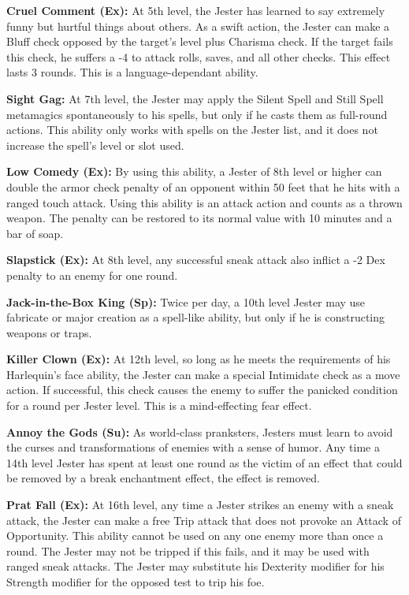 \documentclass[10pt]{article}
\newcommand{\ability}[2]{\smallskip \noindent \textbf{#1} #2}
\begin{document}
\ability{Cruel Comment (Ex):}{At 5th level, the Jester has learned to say extremely funny but hurtful things about others. As a swift action, the Jester can make a Bluff check opposed by the target's level plus Charisma check. If the target fails this check, he suffers a -4 to attack rolls, saves, and all other checks. This effect lasts 3 rounds. This is a language-dependant ability.}

\ability{Sight Gag:}{At 7th level, the Jester may apply the Silent Spell and Still Spell metamagics spontaneously to his spells, but only if he casts them as full-round actions. This ability only works with spells on the Jester list, and it does not increase the spell's level or slot used.}

\ability{Low Comedy (Ex):}{By using this ability, a Jester of 8th level or higher can double the armor check penalty of an opponent within 50 feet that he hits with a ranged touch attack. Using this ability is an attack action and counts as a thrown weapon. The penalty can be restored to its normal value with 10 minutes and a bar of soap.}

\ability{Slapstick (Ex):}{At 8th level, any successful sneak attack also inflict a -2 Dex penalty to an enemy for one round.}

\ability{Jack-in-the-Box King (Sp):}{Twice per day, a 10th level Jester may use fabricate or major creation as a spell-like ability, but only if he is constructing weapons or traps.}

\ability{Killer Clown (Ex):}{At 12th level, so long as he meets the requirements of his Harlequin's face ability, the Jester can make a special Intimidate check as a move action. If successful, this check causes the enemy to suffer the panicked condition for a round per Jester level. This is a mind-effecting fear effect.}

\ability{Annoy the Gods (Su):}{As world-class pranksters, Jesters must learn to avoid the curses and transformations of enemies with a sense of humor. Any time a 14th level Jester has spent at least one round as the victim of an effect that could be removed by a break enchantment effect, the effect is removed.}

\ability{Prat Fall (Ex):}{At 16th level, any time a Jester strikes an enemy with a sneak attack, the Jester can make a free Trip attack that does not provoke an Attack of Opportunity. This ability cannot be used on any one enemy more than once a round. The Jester may not be tripped if this fails, and it may be used with ranged sneak attacks. The Jester may substitute his Dexterity modifier for his Strength modifier for the opposed test to trip his foe.}
\end{document}
